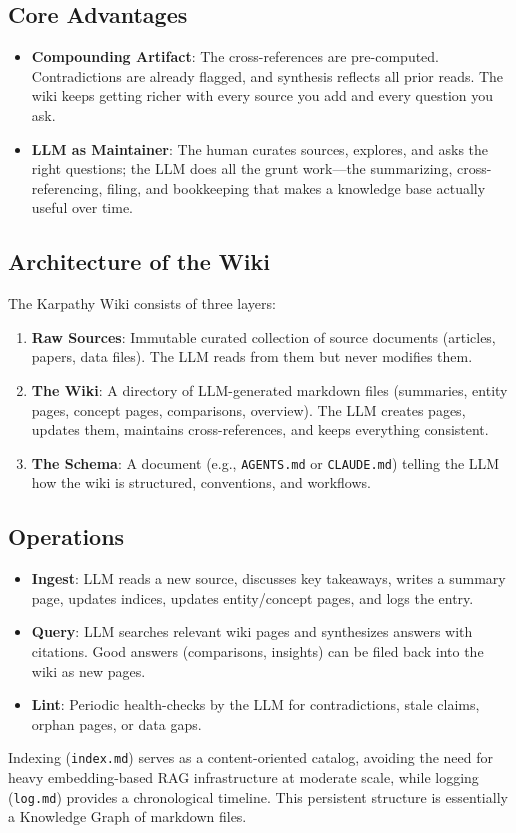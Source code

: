 \documentclass[12pt]{article}
\begin{document}
\subsection{Core Advantages}
\begin{itemize}
    \item \textbf{Compounding Artifact}: The cross-references are pre-computed. Contradictions are already flagged, and synthesis reflects all prior reads. The wiki keeps getting richer with every source you add and every question you ask.
    \item \textbf{LLM as Maintainer}: The human curates sources, explores, and asks the right questions; the LLM does all the grunt work---the summarizing, cross-referencing, filing, and bookkeeping that makes a knowledge base actually useful over time.
\end{itemize}

\subsection{Architecture of the Wiki}
The Karpathy Wiki consists of three layers:
\begin{enumerate}
    \item \textbf{Raw Sources}: Immutable curated collection of source documents (articles, papers, data files). The LLM reads from them but never modifies them.
    \item \textbf{The Wiki}: A directory of LLM-generated markdown files (summaries, entity pages, concept pages, comparisons, overview). The LLM creates pages, updates them, maintains cross-references, and keeps everything consistent.
    \item \textbf{The Schema}: A document (e.g., \texttt{AGENTS.md} or \texttt{CLAUDE.md}) telling the LLM how the wiki is structured, conventions, and workflows.
\end{enumerate}

\subsection{Operations}
\begin{itemize}
    \item \textbf{Ingest}: LLM reads a new source, discusses key takeaways, writes a summary page, updates indices, updates entity/concept pages, and logs the entry.
    \item \textbf{Query}: LLM searches relevant wiki pages and synthesizes answers with citations. Good answers (comparisons, insights) can be filed back into the wiki as new pages.
    \item \textbf{Lint}: Periodic health-checks by the LLM for contradictions, stale claims, orphan pages, or data gaps.
\end{itemize}
Indexing (\texttt{index.md}) serves as a content-oriented catalog, avoiding the need for heavy embedding-based RAG infrastructure at moderate scale, while logging (\texttt{log.md}) provides a chronological timeline. This persistent structure is essentially a Knowledge Graph of markdown files.
\end{document}
